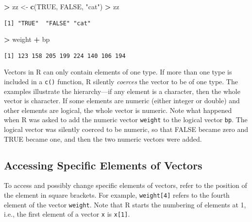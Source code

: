 \documentclass[]{krantz}
\makeatletter
\newenvironment{Shaded}{\begin{snugshade}}{\end{snugshade}}
\newcommand{\KeywordTok}[1]{\textcolor[rgb]{0.27,0.27,0.27}{\textbf{#1}}}
\newcommand{\NormalTok}[1]{#1}
\newcommand{\OperatorTok}[1]{\textcolor[rgb]{0.43,0.43,0.43}{\textbf{#1}}}
\newcommand{\OtherTok}[1]{\textcolor[rgb]{0.37,0.37,0.37}{#1}}
\newcommand{\StringTok}[1]{\textcolor[rgb]{0.5,0.5,0.5}{#1}}
\newenvironment{kframe}{%
\medskip{}
\setlength{\fboxsep}{.8em}
 \def\at@end@of@kframe{}%
 \ifinner\ifhmode%
  \def\at@end@of@kframe{\end{minipage}}%
  \begin{minipage}{\columnwidth}%
 \fi\fi%
 \def\FrameCommand##1{\hskip\@totalleftmargin \hskip-\fboxsep
 \colorbox{shadecolor}{##1}\hskip-\fboxsep
     \hskip-\linewidth \hskip-\@totalleftmargin \hskip\columnwidth}%
 \MakeFramed {\advance\hsize-\width
   \@totalleftmargin\z@ \linewidth\hsize
   \@setminipage}}%
 {\par\unskip\endMakeFramed%
 \at@end@of@kframe}
\renewenvironment{Shaded}{\begin{kframe}}{\end{kframe}}
\makeatother
\begin{document}
\begin{Shaded}
\begin{Highlighting}[]
\OperatorTok{>}\StringTok{ }\NormalTok{zz <-}\StringTok{ }\KeywordTok{c}\NormalTok{(}\OtherTok{TRUE}\NormalTok{, }\OtherTok{FALSE}\NormalTok{, }\StringTok{"cat"}\NormalTok{)}
\OperatorTok{>}\StringTok{ }\NormalTok{zz}
\end{Highlighting}
\end{Shaded}

\begin{verbatim}
[1] "TRUE"  "FALSE" "cat"  
\end{verbatim}

\begin{Shaded}
\begin{Highlighting}[]
\OperatorTok{>}\StringTok{ }\NormalTok{weight }\OperatorTok{+}\StringTok{ }\NormalTok{bp}
\end{Highlighting}
\end{Shaded}

\begin{verbatim}
[1] 123 158 205 199 224 140 106 194
\end{verbatim}

Vectors in R can only contain elements of one type. If more than one type is included in a \texttt{c()} function, R silently \emph{coerces} the vector to be of one type. The examples illustrate the hierarchy---if any element is a character, then the whole vector is character. If some elements are numeric (either integer or double) and other elements are logical, the whole vector is numeric. Note what happened when R was asked to add the numeric vector \texttt{weight} to the logical vector \texttt{bp}. The logical vector was silently coerced to be numeric, so that FALSE became zero and TRUE became one, and then the two numeric vectors were added.

\hypertarget{accessing-specific-elements-of-vectors}{%
\subsection{Accessing Specific Elements of Vectors}\label{accessing-specific-elements-of-vectors}}

To access and possibly change specific elements of vectors, refer to the position of the element in square brackets. For example, \texttt{weight{[}4{]}} refers to the fourth element of the vector \texttt{weight}. Note that R starts the numbering of elements at 1, i.e., the first element of a vector \texttt{x} is \texttt{x{[}1{]}}.
\end{document}
